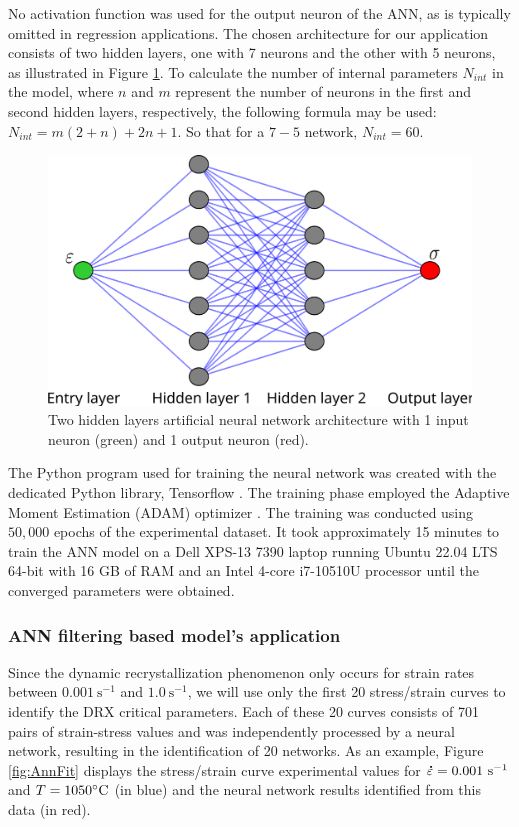 \documentclass[metals,article,submit,pdftex,moreauthors]{Definitions/mdpi}
\DeclareRobustCommand{\mdot}[1]{\accentset{\mbox{\bfseries .}}{#1}}
\DeclareRobustCommand{\ps}{\text{s}^{-1}}
\begin{document}
No activation function was used for the output neuron of the ANN, as is typically omitted in regression applications.
The chosen architecture for our application consists of two hidden layers, one with 7 neurons and the other with 5 neurons, as illustrated in Figure \ref{fig:ANN-7-5}.
To calculate the number of internal parameters $N_{int}$ in the model, where $n$ and $m$ represent the number of neurons in the first and second hidden layers, respectively, the following formula may be used: $N_{int}=m(2+n)+2n+1$.
So that for a $7-5$ network, $N_{int}=60$.
\begin{figure}[H]
\centering
\includegraphics[width=0.7\columnwidth]{Figures/ANN-7-5}
\caption{Two hidden layers artificial neural network architecture with 1 input neuron (green) and 1 output neuron (red).}
\label{fig:ANN-7-5}
\end{figure}
The Python program used for training the neural network was created with the dedicated Python library, Tensorflow \cite{Abadi-2016}.
The training phase employed the Adaptive Moment Estimation (ADAM) optimizer \cite{Kingma-2015}.
The training was conducted using $50,000$ epochs of the experimental dataset.
It took approximately 15 minutes to train the ANN model on a Dell XPS-13 7390 laptop running Ubuntu 22.04 LTS 64-bit with 16 GB of RAM and an Intel 4-core i7-10510U processor until the converged parameters were obtained.

\subsubsection{ANN filtering based model's application \label{subsec:ANNapplication}}

Since the dynamic recrystallization phenomenon only occurs for strain rates between $0.001~\ps$ and $1.0~\ps$, we will use only the first 20 stress/strain curves to identify the DRX critical parameters.
Each of these 20 curves consists of 701 pairs of strain-stress values and was independently processed by a neural network, resulting in the identification of 20 networks.
As an example, Figure \ref{fig:AnnFit} displays the stress/strain curve experimental values for $\mdot\varepsilon=0.001~\ps$ and $T=1050\celsius$ (in blue) and the neural network results identified from this data (in red).
\end{document}

